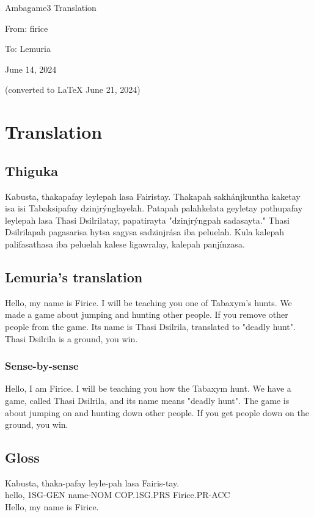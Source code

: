 \documentclass{thiguka}
\begin{document}
Ambagame3 Translation

From: firice

To: Lemuria

June 14, 2024

(converted to \LaTeX{} June 21, 2024)

\section{Translation}
\subsection{Thiguka}

Kabusta, thakapafay leylepah lasa Fairistay. Thakapah sakhánjkuntha kaketay isa isi
Tabaksipafay dzinjrýnglayelah. Patapah palahkelata geyletay pothupafay leylepah lasa
Thasi Dsilrilatay, papatirayta "dzinjrýngpah sadasayta." Thasi Dsilrilapah pagasarisa 
hytsa sagysa sadzinjrása iba peluelah. Kula kalepah palifasathasa iba peluelah kalese 
ligawralay, kalepah panjínzasa.
                            
\subsection{Lemuria's translation}
Hello, my name is Firice. I will be teaching you one of Tabaxym's hunts. We made a
game about jumping and hunting other people. If you remove other people from the
game. Its name is Thasi Dsilrila, translated to "deadly hunt". Thasi Dsilrila is a
ground, you win.

\subsubsection{Sense-by-sense}
Hello, I am Firice.
I will be teaching you how the Tabaxym hunt.
We have a game, called Thasi Dsilrila, and its name means "deadly hunt".
The game is about jumping on and hunting down other people.
If you get people down on the ground, you win.

\subsection{Gloss}

\begin{exe}
\ex{} \gll{}Kabusta, thaka-pafay leyle-pah lasa        Fairis-tay.\\
            hello,   1SG-GEN     name-NOM  COP.1SG.PRS Firice.PR-ACC\\
      \glt{}Hello, my name is Firice.
\end{exe}
\end{document}
